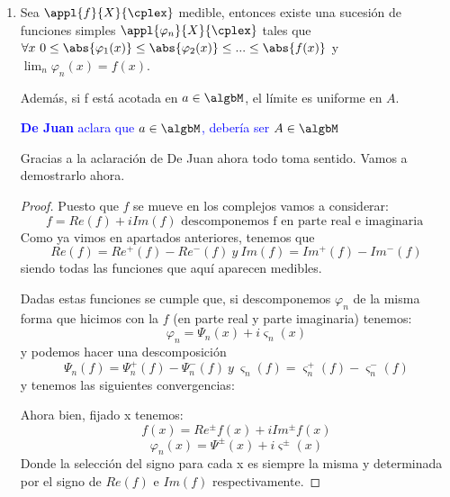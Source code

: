 \documentclass{apuntes}
\begin{document}
\begin{enumerate}
\begin{enumerate}
\begin{proof}
\[\forall n \in \nat \ \forall k \in \nat, \ 0 \leq k \leq 2^{2n}-1\]
Definimos
\[E_n^k = f^{-1}((k2^{-n}, (k+1)2^{-n}])\]
y
\[F_n = f^{-1}((2^n, \infty ])\]

Y definimos ahora
\[\varphi_n(x)= \sum_{k=0}^{2^{2n}-1}\left(k2^{-n}\ind_{E_n^k}(x)\right)+2^n \ind_{F_n}\]
Con esta construcción vemos obviamente que $\varphi_n(x) \leq \varphi_{n-+1}(x)$. Además tenemos:
\[\forall x \ \lim_n \varphi_n(x)=f(x)\]

Nos queda ver la última parte del enunciado, que si f está acotada en $A \in \algbM$, $\varphi_n$ converge uniformemente a $f$ en $A$.

Si f está acotada tenemos que $\exists n \ \forall x \in A \ |f(x)|<2^n$. Entonces
\[\forall x \in A, \ \forall m \geq n \ f(x)-f_n(x) < \frac{1}{n}\]
es decir, converge uniformemente en $A$
\end{proof}

\item Sea $\appl{f}{X}{\cplex}$ medible, entonces existe una sucesión de funciones simples $\appl{\varphi_n}{X}{\cplex}$ tales que $\forall x \ 0 \leq \abs{\varphi_1(x)} \leq \abs{\varphi_2(x)} \leq ... \leq \abs{f(x)}$ y $\lim_n \varphi_n(x)=f(x)$.

Además, si f está acotada en $a \in \algbM$, el límite es uniforme en $A$.

\textcolor{blue}{\textbf{De Juan} aclara que $a \in \algbM$, debería ser $A \in \algbM$}

Gracias a la aclaración de De Juan ahora todo toma sentido. Vamos a demostrarlo ahora.
\begin{proof}
Puesto que $f$ se mueve en los complejos vamos a considerar:
\[f=Re(f)+i Im(f) \text{ descomponemos f en parte real e imaginaria }\]
Como ya vimos en apartados anteriores, tenemos que
\[Re(f)=Re^+(f)-Re^-(f) \ y \ Im(f)=Im^+(f)-Im^-(f)\]
siendo todas las funciones que aquí aparecen medibles.

Dadas estas funciones se cumple que, si descomponemos $\varphi_n$ de la misma forma que hicimos con la $f$ (en parte real y parte imaginaria) tenemos:
\[\varphi_n = \Psi_n(x)+i\varsigma_n(x)\]
y podemos hacer una descomposición
\[\Psi_n(f)=\Psi_n^+(f)-\Psi_n^-(f) \ y \ \varsigma_n(f)=\varsigma_n^+(f)-\varsigma_n^-(f)\]
y tenemos las siguientes convergencias:

Ahora bien, fijado x tenemos:
\[f(x)= Re^{\pm}f(x)+i Im^{\pm}f(x)\]
\[\varphi_n(x)= \Psi^{\pm}(x)+i \varsigma^{\pm}(x)\]
Donde la selección del signo para cada x es siempre la misma y determinada por el signo de $Re(f)$ e $Im(f)$ respectivamente.


\end{proof}
\end{enumerate}
\end{enumerate}
\end{document}
